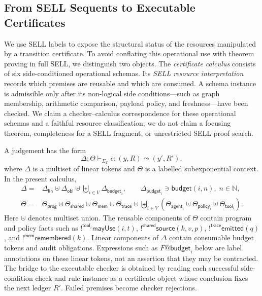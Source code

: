 \documentclass[a4paper,fleqn]{cas-sc}
\newcommand{\Nat}{\mathbb{N}}
\begin{document}
\subsection{From SELL Sequents to Executable Certificates}\label{subsec:sell-sequents-certificates}

We use SELL labels to expose the structural status of the resources manipulated
by a transition certificate. To avoid conflating this operational use with
theorem proving in full SELL, we distinguish two objects. The \emph{certificate
calculus} consists of six side-conditioned operational schemas. Its
\emph{SELL resource interpretation} records which premises are reusable and
which are consumed. A schema instance is admissible only after its non-logical
side conditions---such as graph membership, arithmetic comparison, payload
policy, and freshness---have been checked. We claim a checker--calculus
correspondence for these operational schemas and a faithful resource
classification; we do not claim a focusing theorem, completeness for a SELL
fragment, or unrestricted SELL proof search.

A judgement has the form
\[
  \Delta;\Theta\vdash_{\Sigma_{\Gamma}} e:(y,R)\leadsto(y',R'),
\]
where \(\Delta\) is a multiset of linear tokens and \(\Theta\) is a labelled subexponential context. In the present calculus,
\[
\begin{aligned}
  \Delta={}&
  \Delta_{\mathsf{lin}}\uplus
  \Delta_{\mathsf{obl}}\uplus
  \biguplus_{i\in V}\Delta_{\mathsf{budget}_i},
  \qquad
  \Delta_{\mathsf{budget}_i}\ni \mathsf{budget}(i,n),\; n\in\Nat,\\
  \Theta={}&
  \Theta_{\mathsf{prog}}\uplus
  \Theta_{\mathsf{shared}}\uplus
  \Theta_{\mathsf{mem}}\uplus
  \Theta_{\mathsf{trace}}\uplus
  \biguplus_{i\in V}
  (\Theta_{\mathsf{agent}_i}\uplus\Theta_{\mathsf{policy}_i}\uplus
   \Theta_{\mathsf{tool}_i}).
\end{aligned}
\]
Here \(\uplus\) denotes multiset union. The reusable components of
\(\Theta\) contain program and policy facts such as
\(!^{\mathsf{tool}_i}\mathsf{mayUse}(i,t)\),
\(!^{\mathsf{shared}}\mathsf{source}(k,v,p)\),
\(!^{\mathsf{trace}}\mathsf{emitted}(q)\), and
\(!^{\mathsf{mem}}\mathsf{remembered}(k)\). Linear components of
\(\Delta\) contain consumable budget tokens and audit obligations.
Expressions such as \(F@\mathsf{budget}_i\) below are label annotations on
these linear tokens, not an assertion that they may be contracted. The bridge
to the executable checker is obtained by reading each successful
side-condition check and rule instance as a certificate object whose
conclusion fixes the next ledger \(R'\). Failed premises become checker
rejections.
\end{document}
